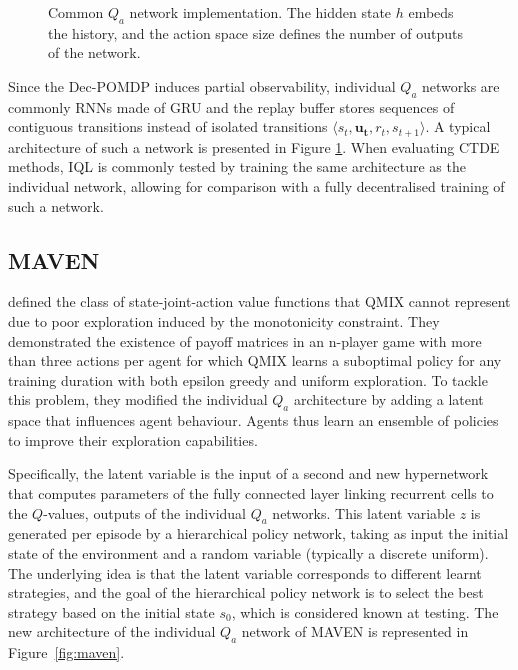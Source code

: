 \begin{figure}
    \centering

\caption{Common $Q_a$ network implementation. The hidden state $h$ embeds the history, and the action space size defines the number of outputs of the network.}
\label{fig:ch3_indivQ}
\end{figure}

Since the Dec-POMDP induces partial observability, individual $Q_a$ networks are commonly RNNs made of GRU \citep{Chung2014EmpiricalModeling} and the replay buffer stores sequences of contiguous transitions instead of isolated transitions $\langle s_{t},\mathbf{u_{t}},r_{t},s_{t+1}\rangle$.
A typical architecture of such a network is presented in Figure \ref{fig:ch3_indivQ}.
When evaluating CTDE methods, IQL is commonly tested by training the same architecture as the individual network, allowing for comparison with a fully decentralised training of such a network.

\subsection{MAVEN}
\citet{Mahajan2019MAVEN:Exploration} defined the class of state-joint-action value functions that QMIX cannot represent due to poor exploration induced by the monotonicity constraint.
They demonstrated the existence of payoff matrices in an n-player game with more than three actions per agent for which QMIX learns a suboptimal policy for any training duration with both epsilon greedy and uniform exploration.
To tackle this problem, they modified the individual $Q_a$ architecture by adding a latent space that influences agent behaviour.
Agents thus learn an ensemble of policies to improve their exploration capabilities.

Specifically, the latent variable is the input of a second and new hypernetwork that computes parameters of the fully connected layer linking recurrent cells to the $Q$-values, outputs of the individual $Q_a$ networks.
This latent variable $z$ is generated per episode by a hierarchical policy network, taking as input the initial state of the environment and a random variable (typically a discrete uniform).
The underlying idea is that the latent variable corresponds to different learnt strategies, and the goal of the hierarchical policy network is to select the best strategy based on the initial state $s_0$, which is considered known at testing.
The new architecture of the individual $Q_a$ network of MAVEN is represented in Figure~\ref{fig:maven}.

